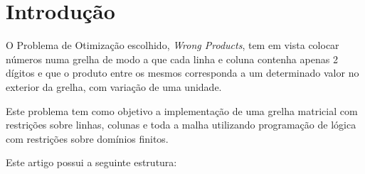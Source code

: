 \documentclass[11pt]{article}
\begin{document}
\section{Introdução}

O Problema de Otimização escolhido, \emph{Wrong Products}, tem em vista colocar números 
numa grelha de modo a que cada linha e coluna contenha apenas 2 dígitos e que o produto entre 
os mesmos corresponda a um determinado valor no exterior da grelha, com variação de uma unidade.

Este problema tem como objetivo a implementação de uma grelha matricial com restrições sobre 
linhas, colunas e toda a malha utilizando programação de lógica com restrições sobre domínios 
finitos.

\bigskip

Este artigo possui a seguinte estrutura:
\end{document}
